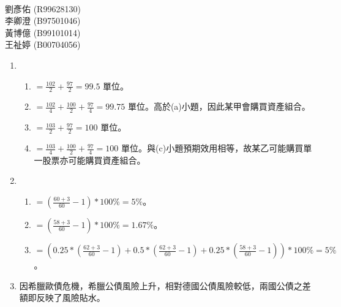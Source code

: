 \documentclass[12pt]{article}
\begin{document}
\begin{CJK}{UTF8}{cwmb}
\renewcommand{\figurename}{圖}

\voffset=-1cm
\textwidth=5.6in
\textheight=9.2in

\newenvironment{num}
 {\leftmargini=6mm\leftmarginii=8mm
  \begin{enumerate}\itemsep=-2pt}
 {\end{enumerate}}

\newenvironment{sol}
 {\begin{quote}\mbox{}\llap{\color{blue}{解答:}\rule{10mm}{0pt}}\hspace*{-4pt}}{\end{quote}}


\thispagestyle{empty}
\fontsize{12}{20pt}\selectfont
\begin{center}
{\large{}}\\[3mm]
劉彥佑 (R99628130)\\
李卿澄 (B97501046)\\
黃博億 (B99101014)\\
王祉婷 (B00704056)
\end{center}

\begin{num}
\item 
	\begin{num}
		\item $=\frac{102}{2}+\frac{97}{2}=99.5$ 單位。
		\item $=\frac{102}{4}+\frac{100}{2}+\frac{97}{4}=99.75$ 單位。高於(a)小題，因此某甲會購買資產組合。
		\item $=\frac{103}{2}+\frac{97}{2}=100$ 單位。
		\item $=\frac{103}{4}+\frac{100}{2}+\frac{97}{4}=100$ 單位。與(c)小題預期效用相等，故某乙可能購買單一股票亦可能購買資產組合。
	\end{num}
\item 
	\begin{num}
		\item $=(\frac{60+3}{60}-1)*100\%=5\%$。
		\item $=(\frac{58+3}{60}-1)*100\%=1.67\%$。
		\item $=(0.25*(\frac{62+3}{60}-1)+0.5*(\frac{62+3}{60}-1)+0.25*(\frac{58+3}{60}-1))*100\%=5\%$。
	\end{num}
\item 因希臘歐債危機，希臘公債風險上升，相對德國公債風險較低，兩國公債之差額即反映了風險貼水。
\end{num}

\end{CJK}
\end{document}
